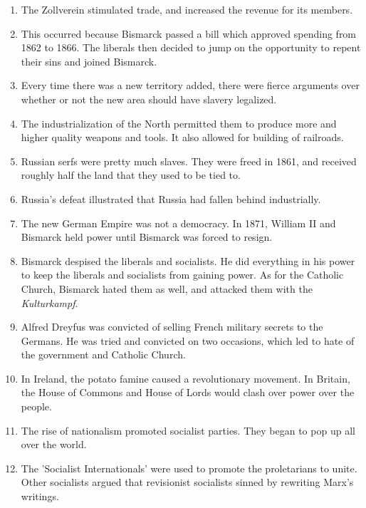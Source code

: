 \documentclass[12pt]{article}
\begin{document}
\begin{enumerate}
\item The Zollverein stimulated trade, and increased the revenue for its members.

\item This occurred because Bismarck passed a bill which approved spending from 1862 to 1866. The liberals then decided to jump on the opportunity to repent their sins and joined Bismarck.  

\item Every time there was a new territory added, there were fierce arguments over whether or not the new area should have slavery legalized.

\item The industrialization of the North permitted them to produce more and higher quality weapons and tools. It also allowed for building of railroads.

\item  Russian serfs were pretty much slaves. They were freed in 1861, and received roughly half the land that they used to be tied to.

\item Russia's defeat illustrated that Russia had fallen behind industrially.

\item The new German Empire was not a democracy. In 1871, William II and Bismarck held power until Bismarck was forced to resign.

\item Bismarck despised the liberals and socialists. He did everything in his power to keep the liberals and socialists from gaining power. As for the Catholic Church, Bismarck hated them as well, and attacked them with the \textit{Kulturkampf}. 

\item Alfred Dreyfus was convicted of selling French military secrets to the Germans. He was tried and convicted on two occasions, which led to hate of the government and Catholic Church.

\item In Ireland, the potato famine caused a revolutionary movement. In Britain, the House of Commons and House of Lords would clash over power over the people.

\item The rise of nationalism promoted socialist parties. They began to pop up all over the world.

\item The 'Socialist Internationals' were used to promote the proletarians to unite. Other socialists argued that revisionist socialists sinned by rewriting Marx's writings.
 

\end{enumerate}
\end{document}
